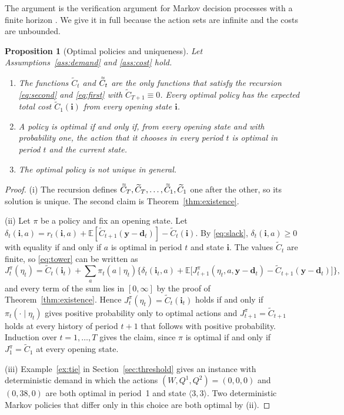 \documentclass[11pt]{article}
\DeclareRobustCommand{\dbtilde}[1]{\accentset{\approx}{#1}}
\renewcommand{\vec}[1]{\boldsymbol{#1}}
\newcommand{\E}{\mathbb{E}}
\newcommand{\Ct}{\widetilde{C}}
\newcommand{\Cq}{\dbtilde{C}}
\newtheorem{proposition}{Proposition}
\theoremstyle{definition}
\begin{document}
The argument is the verification argument for Markov decision processes with a finite horizon \citep{puterman1994markov}. We give it in full because the action sets are infinite and the costs are unbounded.

\begin{proposition}[Optimal policies and uniqueness]\label{prop:unique}
Let Assumptions~\ref{ass:demand} and \ref{ass:cost} hold.
\begin{enumerate}[label=(\roman*)]
\item The functions $\Ct_t$ and $\Cq_t$ are the only functions that satisfy the recursion \eqref{eq:second} and \eqref{eq:first} with $\Ct_{T+1}\equiv0$. Every optimal policy has the expected total cost $\Ct_1(\vec{i})$ from every opening state $\vec{i}$.
\item A policy is optimal if and only if, from every opening state and with probability one, the action that it chooses in every period $t$ is optimal in period $t$ and the current state.
\item The optimal policy is not unique in general.
\end{enumerate}
\end{proposition}

\begin{proof}
(i) The recursion defines $\Cq_T,\Ct_T,\ldots,\Cq_1,\Ct_1$ one after the other, so its solution is unique. The second claim is Theorem~\ref{thm:existence}.

(ii) Let $\pi$ be a policy and fix an opening state. Let $\delta_t(\vec{i},a)=r_t(\vec{i},a)+\E[\Ct_{t+1}(\vec{y}-\vec{d}_t)]-\Ct_t(\vec{i})$. By \eqref{eq:slack}, $\delta_t(\vec{i},a)\ge0$ with equality if and only if $a$ is optimal in period $t$ and state $\vec{i}$. The values $\Ct_t$ are finite, so \eqref{eq:tower} can be written as
\[
J^\pi_t(\eta_t)=\Ct_t(\vec{i}_t)+\sum_{a}\pi_t(a\mid\eta_t)\Big\{\delta_t(\vec{i}_t,a)+\E\big[J^\pi_{t+1}(\eta_t,a,\vec{y}-\vec{d}_t)-\Ct_{t+1}(\vec{y}-\vec{d}_t)\big]\Big\},
\]
and every term of the sum lies in $[0,\infty]$ by the proof of Theorem~\ref{thm:existence}. Hence $J^\pi_t(\eta_t)=\Ct_t(\vec{i}_t)$ holds if and only if $\pi_t(\cdot\mid\eta_t)$ gives positive probability only to optimal actions and $J^\pi_{t+1}=\Ct_{t+1}$ holds at every history of period $t+1$ that follows with positive probability. Induction over $t=1,\ldots,T$ gives the claim, since $\pi$ is optimal if and only if $J^\pi_1=\Ct_1$ at every opening state.

(iii) Example~\ref{ex:tie} in Section~\ref{sec:threshold} gives an instance with deterministic demand in which the actions $(W,Q^1,Q^2)=(0,0,0)$ and $(0,38,0)$ are both optimal in period~1 and state $\langle3,3\rangle$. Two deterministic Markov policies that differ only in this choice are both optimal by (ii).
\end{proof}
\end{document}
